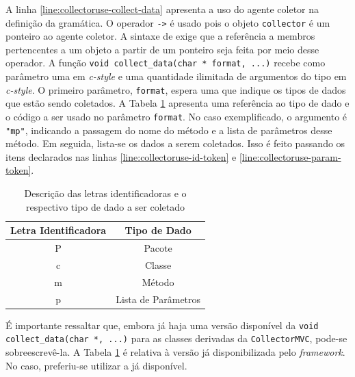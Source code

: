 A linha \ref{line:collectoruse-collect-data} apresenta a uso do agente coletor
na definição da gramática. O operador \lstinline|->| é usado pois o objeto
\lstinline|collector| é um ponteiro ao agente coletor. A sintaxe de \cpp exige
que a referência a membros pertencentes a um objeto a partir de um ponteiro seja
feita por meio desse operador. A função \lstinline|void collect_data(char * format, ...)|
recebe como parâmetro uma \str em \textit{c-style} e uma quantidade ilimitada de
argumentos do tipo \str em \textit{c-style}. O primeiro parâmetro, \lstinline|format|, espera
uma \str que indique os tipos de dados que estão sendo coletados. A Tabela
\ref{reference-format-collect-data} apresenta uma referência ao tipo de dado e
o código a ser usado no parâmetro \lstinline|format|. No caso exemplificado,
o argumento é \lstinline|"mp"|, indicando a passagem do nome do método e a
lista de parâmetros desse método. Em seguida, lista-se os dados a serem coletados.
Isso é feito passando os itens declarados nas linhas
\ref{line:collectoruse-id-token} e \ref{line:collectoruse-param-token}.

\begin{table}[h]
\centering
\caption{Descrição das letras identificadoras e o respectivo tipo de dado a ser coletado}
\label{reference-format-collect-data}
\begin{tabular}{|c|c|}
\hline
\textbf{Letra Identificadora} & \textbf{Tipo de Dado}        \\ \hline
P                             & Pacote                       \\ \hline
c                             & Classe                       \\ \hline
m                             & Método                       \\ \hline
p                             & Lista de Parâmetros          \\ \hline
\end{tabular}
\end{table}

É importante ressaltar que, embora já haja uma versão disponível da
\lstinline|void collect_data(char *, ...)| para as classes derivadas da
\lstinline|CollectorMVC|, pode-se sobreescrevê-la. A Tabela
\ref{reference-format-collect-data} é relativa à versão já disponibilizada
pelo \textit{framework}. No caso, preferiu-se utilizar a já disponível.

